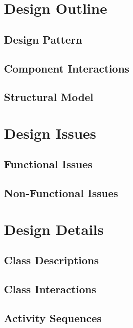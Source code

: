 \documentclass[12pt]{article}
\begin{document}
\section{Design Outline}

\subsection{Design Pattern}

\subsection{Component Interactions}

\subsection{Structural Model}




\section{Design Issues}

\subsection{Functional Issues}

\subsection{Non-Functional Issues}




\section{Design Details}

\subsection{Class Descriptions}

\subsection{Class Interactions}

\subsection{Activity Sequences}
\end{document}
